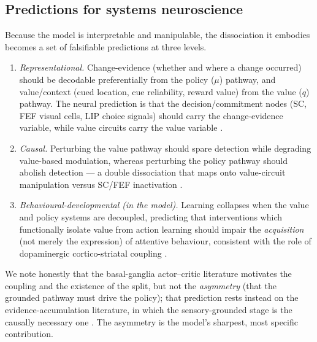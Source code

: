 \subsection{Predictions for systems neuroscience}
Because the model is interpretable and manipulable, the dissociation it embodies
becomes a set of falsifiable predictions at three levels.
\begin{enumerate}
\item \emph{Representational.} Change-evidence (whether and where a change occurred)
should be decodable preferentially from the policy ($\mu$) pathway, and value/context
(cued location, cue reliability, reward value) from the value ($q$) pathway. The neural
prediction is that the decision/commitment nodes (SC, FEF visual cells, LIP choice
signals) should carry the change-evidence variable, while value circuits carry the
value variable \citep{thompson2005neuronal, stine2023differential, platt1999neural}.
\item \emph{Causal.} Perturbing the value pathway should spare detection while degrading
value-based modulation, whereas perturbing the policy pathway should abolish detection
--- a double dissociation that maps onto value-circuit manipulation versus SC/FEF
inactivation \citep{zenon2012attention, wardak2006contribution, herman2018gain}.
\item \emph{Behavioural-developmental (in the model).} Learning collapses when the value
and policy systems are decoupled, predicting that interventions which functionally
isolate value from action learning should impair the \emph{acquisition} (not merely the
expression) of attentive behaviour, consistent with the role of dopaminergic
cortico-striatal coupling \citep{schultz1997neural, collins2014opponent}.
\end{enumerate}
We note honestly that the basal-ganglia actor--critic literature motivates the
coupling and the existence of the split, but not the \emph{asymmetry} (that the
grounded pathway must drive the policy); that prediction rests instead on the
evidence-accumulation literature, in which the sensory-grounded stage is the causally
necessary one \citep{katz2016dissociated, gold2007neural}. The asymmetry is the model's
sharpest, most specific contribution.

